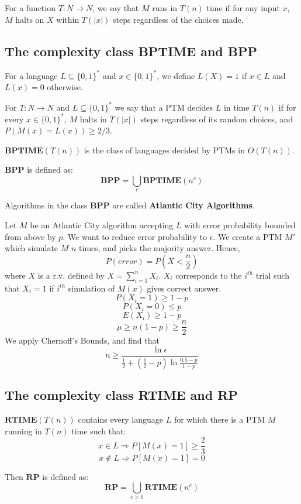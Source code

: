 \documentclass[12pt,letterpaper]{article}
\theoremstyle{definition}
\begin{document}
For a function $T:N \rightarrow N$, we say that $M$ runs in $T(n)$ time if for any input $x$, $M$ halts on $X$ within $T(|x|)$ steps regardless of the choices made.

\subsection{The complexity class BPTIME and BPP}

For a language $L \subseteq \{0,1\}^*$ and $x \in \{0,1\}^*$, we define $L(X) = 1$ if $x \in L$ and $L(x) = 0$ otherwise.

For $T : N \rightarrow N$ and $L \subseteq \{0,1\}^*$ we say that a PTM decides $L$ in time $T(n)$ if for every $x \in \{0,1\}^*$, $M$ halts in $T(|x|)$ steps regardless of its random choices, and $P(M(x) = L(x)) \geq 2/3$. 

$\mathbf{BPTIME}(T(n))$ is the class of languages decided by PTMs in $O(T(n))$.

$\mathbf{BPP}$ is defined as:
\[\mathbf{BPP} = \bigcup_{c} \mathbf{BPTIME}(n^c)\]

Algorithms in the class $\mathbf{BPP}$ are called \textbf{Atlantic City Algorithms}.

Let $M$ be an Atlantic City algorithm accepting $L$ with error probability bounded from above by $p$. We want to reduce error probability to $\epsilon$. We create a PTM $M'$ which simulate $M$ $n$ times, and picks the majority answer. Hence,
\[P(error) = P(X < \frac{n}{2})\]
where $X$ is a r.v. defined by $X = \sum_{i=1}^n X_i$. $X_i$ corresponds to the $i^{th}$ trial such that $X_i=1$ if $i^{th}$ simulation of $M(x)$ gives correct answer.
\[P(X_i = 1) \geq 1-p\]
\[P(X_i = 0) \leq p\]
\[E(X_i) \geq 1-p\]
\[\mu \geq n(1-p) \geq \frac{n}{2}\]
We apply Chernoff's Bounds, and find that
\[n \geq \frac{\ln \epsilon}{ \frac{1}{2} + (\frac{1}{2} - p) \ln{\frac{0.5-p}{1-p}}}\]

\subsection{The complexity class RTIME and RP}

$\mathbf{RTIME}(T(n))$ contains every language $L$ for which there is a PTM $M$ running in $T(n)$ time such that:
\[x \in L \Rightarrow P[M(x) = 1] \geq \frac{2}{3}\]
\[x \notin L \Rightarrow P[M(x) = 1] = 0\]

Then $\mathbf{RP}$ is defined as:
\[\mathbf{RP} = \bigcup_{c > 0} \mathbf{RTIME}(n^c)\]
\end{document}
